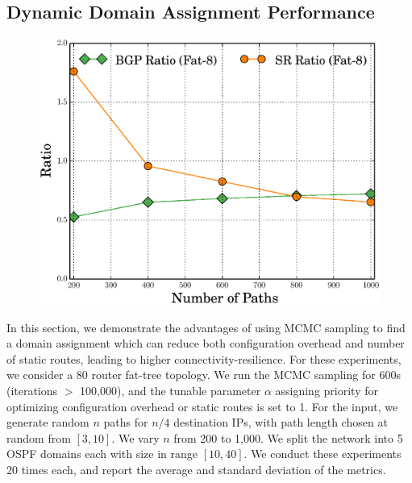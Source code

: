 \begin{figure}
	\centering
\end{figure}
\begin{figure}
	\centering
\end{figure}


\subsection{Dynamic Domain Assignment Performance} \label{sec:mcmceval}
\begin{figure}
	\includegraphics[width=0.33\columnwidth]{figures/ratioMCMC.eps}
\end{figure}

In this section, we demonstrate the advantages of using MCMC sampling
to find a domain assignment which can  
reduce both configuration overhead and number of static routes, 
leading to higher connectivity-resilience. 
For these experiments,
we consider a
80 router fat-tree topology. 
We run the MCMC sampling for 600s
(iterations $>$ 100,000), 
and the tunable parameter $\alpha$ assigning
priority for optimizing configuration 
overhead or static routes is set
to 1. For the input, we generate 
random $n$ paths for $n/4$
destination IPs, with path
 length chosen at random from $[3,10]$. 
We vary $n$ from 200 to 1,000.
We
split the network into 5 OSPF domains 
each with size in range $[10,40]$. We
conduct these experiments 20 times each, 
and report the average and
standard deviation of the metrics.

